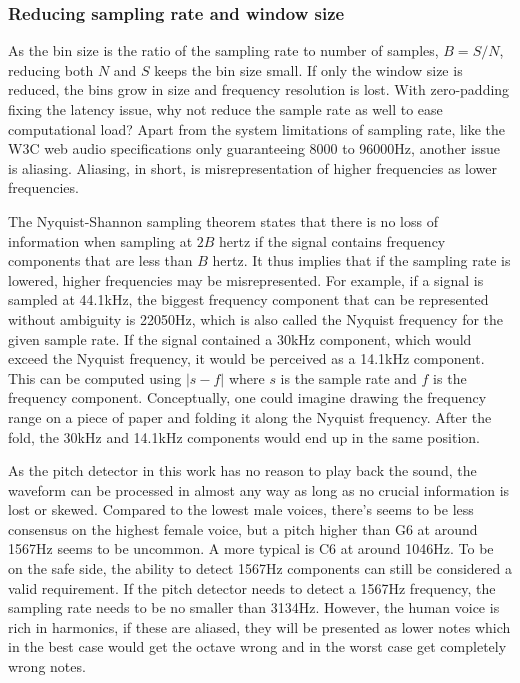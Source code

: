 \subsubsection{Reducing sampling rate and window size}
As the bin size is the ratio of the sampling rate to number of samples, $B = S/N$, reducing both $N$ and $S$ keeps the bin size small. If only the window size is reduced, the bins grow in size and frequency resolution is lost. With zero-padding fixing the latency issue, why not reduce the sample rate as well to ease computational load? Apart from the system limitations of sampling rate, like the W3C web audio specifications only guaranteeing 8000 to 96000Hz, another issue is aliasing. Aliasing, in short, is misrepresentation of higher frequencies as lower frequencies. 

The Nyquist-Shannon sampling theorem states that there is no loss of information when sampling at $2B$ hertz if the signal contains frequency components that are less than $B$ hertz. It thus implies that if the sampling rate is lowered, higher frequencies may be misrepresented. For example, if a signal is sampled at 44.1kHz, the biggest frequency component that can be represented without ambiguity is 22050Hz, which is also called the Nyquist frequency for the given sample rate. If the signal contained a 30kHz component, which would exceed the Nyquist frequency, it would be perceived as a 14.1kHz component. This can be computed using $|s-f|$ where $s$ is the sample rate and $f$ is the frequency component. Conceptually, one could imagine drawing the frequency range on a piece of paper and folding it along the Nyquist frequency. After the fold, the 30kHz and 14.1kHz components would end up in the same position.

As the pitch detector in this work has no reason to play back the sound, the waveform can be processed in almost any way as long as no crucial information is lost or skewed. Compared to the lowest male voices, there's seems to be less consensus on the highest female voice, but a pitch higher than G6 at around 1567Hz seems to be uncommon. A more typical is C6 at around 1046Hz. To be on the safe side, the ability to detect 1567Hz components can still be considered a valid requirement. If the pitch detector needs to detect a 1567Hz frequency, the sampling rate needs to be no smaller than 3134Hz. However, the human voice is rich in harmonics, if these are aliased, they will be presented as lower notes which in the best case would get the octave wrong and in the worst case get completely wrong notes.


